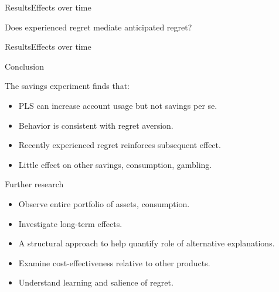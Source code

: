 \documentclass[aspectratio=169]{beamer}
\newenvironment{wideitemize}{\itemize\addtolength{\itemsep}{10pt}}{\enditemize}
\begin{document}
\begin{frame}{Results}{Effects over time}

	\centering \large Does experienced regret mediate anticipated regret?

\end{frame}

\begin{frame}{Results}{Effects over time}
	
	

\end{frame}



\begin{frame}{Conclusion}

	\begin{wideitemize}
		\item The savings experiment finds that:
		\begin{itemize}
			\item PLS can increase account usage but not savings per se.
			\item Behavior is consistent with regret aversion.
			\item Recently experienced regret reinforces subsequent effect.
			\item Little effect on other savings, consumption, gambling.
		\end{itemize}
		\item Further research
		\begin{itemize}
			\item Observe entire portfolio of assets, consumption.
			\item Investigate long-term effects.
			\item A structural approach to help quantify role of alternative explanations.
			\item Examine cost-effectiveness relative to other products.
			\item Understand learning and salience of regret.
		\end{itemize}
	\end{wideitemize}

\end{frame}
\end{document}
